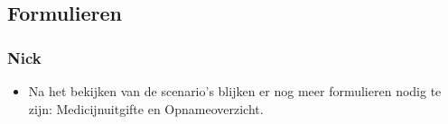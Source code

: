 
\subsection*{Formulieren}
\subsubsection*{Nick}
\begin{itemize}
  \item Na het bekijken van de scenario's blijken er nog meer formulieren nodig te zijn: Medicijnuitgifte en Opnameoverzicht.
\end{itemize}
